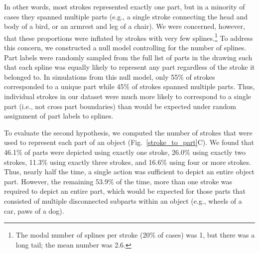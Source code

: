 \documentclass[10pt,letterpaper]{article}
\begin{document}
In other words, most strokes represented exactly one part, but in a minority of cases they spanned multiple parts (e.g., a single stroke connecting the head and body of a bird, or an armrest and leg of a chair). 
We were concerned, however, that these proportions were inflated by strokes with very few splines.\footnote{The modal number of splines per stroke (20\% of cases) was 1, but there was a long tail; the mean number was 2.6.}
To address this concern, we constructed a null model controlling for the number of splines.
Part labels were randomly sampled from the full list of parts in the drawing such that each spline was equally likely to represent any part regardless of the stroke it belonged to.
In simulations from this null model, only 55\% of strokes corresponded to a unique part while 45\% of strokes spanned multiple parts. 
Thus, individual strokes in our dataset were much more likely to correspond to a single part (i.e., not cross part boundaries) than would be expected under random assignment of part labels to splines.


To evaluate the second hypothesis, we computed the number of strokes that were used to represent each part of an object (Fig.~\ref{stroke_to_part}C). 
We found that 46.1\% of parts were depicted using exactly one stroke, 26.0\% using exactly two strokes, 11.3\% using exactly three strokes, and 16.6\% using four or more strokes. 
Thus, nearly half the time, a single action was sufficient to depict an entire object part. 
However, the remaining 53.9\% of the time, more than one stroke was required to depict an entire part, which would be expected for those parts that consisted of multiple disconnected subparts within an object (e.g., wheels of a car, paws of a dog).

\end{document}

